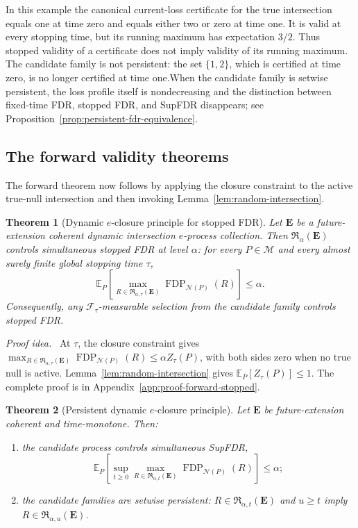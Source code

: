 \documentclass[11pt]{article}
\numberwithin{equation}{section}
\theoremstyle{plain}
\newtheorem{theorem}{Theorem}[section]
\theoremstyle{definition}
\newcommand{\E}{\mathbb E}
\newcommand{\F}{\mathcal F}
\newcommand{\M}{\mathcal M}
\newcommand{\Rfam}{\mathfrak R}
\newcommand{\FDP}{\operatorname{FDP}}
\newcommand{\calN}{\mathcal N}
\newcommand{\proofidea}{\par\medskip\noindent\textit{Proof idea.}\ }
\begin{document}
In this example the canonical current-loss certificate for the true intersection equals one at time zero and equals either two or zero at time one. It is valid at every stopping time, but its running maximum has expectation $3/2$. Thus stopped validity of a certificate does not imply validity of its running maximum. The candidate family is not persistent: the set $\{1,2\}$, which is certified at time zero, is no longer certified at time one.When the candidate family is setwise persistent, the loss profile itself is nondecreasing and the distinction between fixed-time FDR, stopped FDR, and SupFDR disappears; see Proposition~\ref{prop:persistent-fdr-equivalence}.


\subsection{The forward validity theorems}\label{sec:forward}

The forward theorem now follows by applying the closure constraint to the active true-null intersection and then invoking Lemma~\ref{lem:random-intersection}.

\begin{theorem}[Dynamic $e$-closure principle for stopped FDR]\label{thm:forward-stopped}
Let $\mathbf E$ be a future-extension coherent dynamic intersection $e$-process collection. Then $\Rfam_\alpha(\mathbf E)$ controls simultaneous stopped FDR at level $\alpha$: for every $P\in\M$ and every almost surely finite global stopping time $\tau$,
\begin{equation}\label{eq:forward-stopped-result}
  \E_P\!\left[
  \max_{R\in\Rfam_{\alpha,\tau}(\mathbf E)}
  \FDP_{\calN(P)}(R)
  \right]\leq\alpha.
\end{equation}
Consequently, any $\F_\tau$-measurable selection from the candidate family controls stopped FDR.
\end{theorem}

\proofidea
At $\tau$, the closure constraint gives
$\max_{R\in\Rfam_{\alpha,\tau}(\mathbf E)}\FDP_{\calN(P)}(R)\leq\alpha Z_\tau(P)$, with both sides zero when no true null is active. Lemma~\ref{lem:random-intersection} gives $\E_P[Z_\tau(P)]\leq1$. The complete proof is in Appendix~\ref{app:proof-forward-stopped}.

\begin{theorem}[Persistent dynamic $e$-closure principle]\label{thm:forward-persistent}
Let $\mathbf E$ be future-extension coherent and time-monotone. Then:
\begin{enumerate}
\item[(a)] the candidate process controls simultaneous SupFDR,
\begin{equation}\label{eq:forward-sup-result}
  \E_P\!\left[
  \sup_{t\geq0}\max_{R\in\Rfam_{\alpha,t}(\mathbf E)}
  \FDP_{\calN(P)}(R)
  \right]\leq\alpha;
\end{equation}
\item[(b)] the candidate families are setwise persistent: $R\in\Rfam_{\alpha,t}(\mathbf E)$ and $u\geq t$ imply $R\in\Rfam_{\alpha,u}(\mathbf E)$.
\end{enumerate}
\end{theorem}
\end{document}
